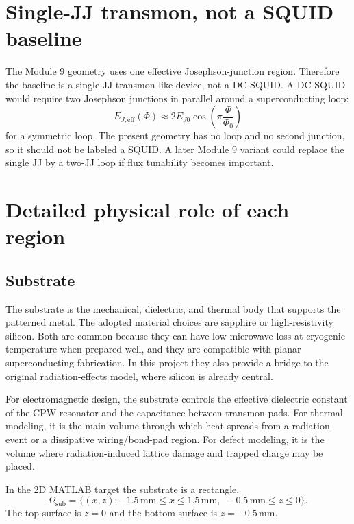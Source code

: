 \documentclass[11pt]{article}
\begin{document}
\section{Single-JJ transmon, not a SQUID baseline}
The Module 9 geometry uses one effective Josephson-junction region. Therefore the baseline is a single-JJ transmon-like device, not a DC SQUID. A DC SQUID would require two Josephson junctions in parallel around a superconducting loop:
\begin{equation}
    E_{J,\mathrm{eff}}(\Phi) \approx 2E_{J0}\cos\left(\pi\frac{\Phi}{\Phi_0}\right)
\end{equation}
for a symmetric loop. The present geometry has no loop and no second junction, so it should not be labeled a SQUID. A later Module 9 variant could replace the single JJ by a two-JJ loop if flux tunability becomes important.

\section{Detailed physical role of each region}
\subsection{Substrate}
The substrate is the mechanical, dielectric, and thermal body that supports the patterned metal. The adopted material choices are sapphire or high-resistivity silicon. Both are common because they can have low microwave loss at cryogenic temperature when prepared well, and they are compatible with planar superconducting fabrication. In this project they also provide a bridge to the original radiation-effects model, where silicon is already central.

For electromagnetic design, the substrate controls the effective dielectric constant of the CPW resonator and the capacitance between transmon pads. For thermal modeling, it is the main volume through which heat spreads from a radiation event or a dissipative wiring/bond-pad region. For defect modeling, it is the volume where radiation-induced lattice damage and trapped charge may be placed.

In the 2D MATLAB target the substrate is a rectangle,
\begin{equation}
    \Omega_{\mathrm{sub}} = \{(x,z): -1.5\,\mathrm{mm}\le x\le 1.5\,\mathrm{mm},\; -0.5\,\mathrm{mm}\le z\le 0\}.
\end{equation}
The top surface is $z=0$ and the bottom surface is $z=-0.5\,\mathrm{mm}$.
\end{document}
